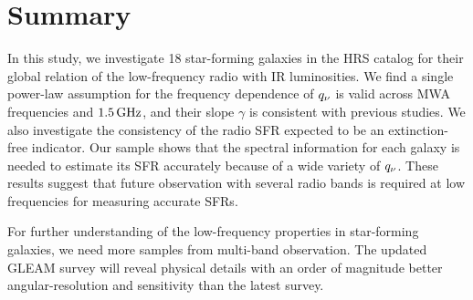 \chapter{Summary}\label{chap:summary}
%
%

In this study, we investigate 18 star-forming galaxies in the HRS catalog for their global relation of the low-frequency radio with IR luminosities.
We find a single power-law assumption for the frequency dependence of $q_{\nu}$ is valid across MWA frequencies and $1.5\,\mathrm{GHz}$, and their slope $\gamma$ is consistent with previous studies.
We also investigate the consistency of the radio SFR expected to be an extinction-free indicator.
Our sample shows that the spectral information for each galaxy is needed to estimate its SFR accurately because of a wide variety of $q_{\nu}$.
These results suggest that future observation with several radio bands is required at low frequencies for measuring accurate SFRs.

For further understanding of the low-frequency properties in star-forming galaxies, we need more samples from multi-band observation.
The updated GLEAM survey will reveal physical details with an order of magnitude better angular-resolution and sensitivity than the latest survey.
